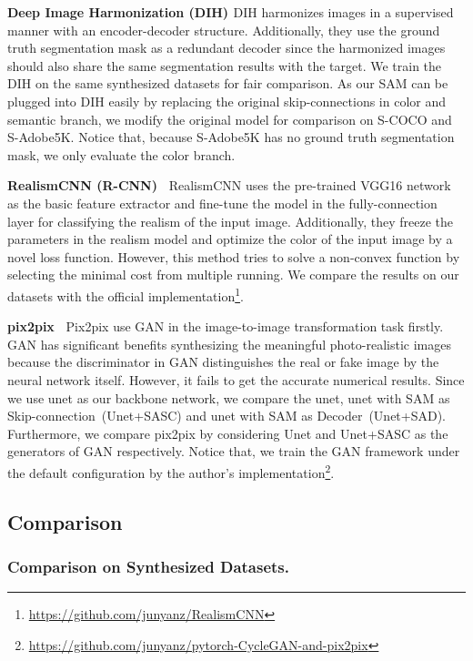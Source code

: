 \textbf{Deep Image Harmonization (DIH) \cite{Tsai:2017kv}} DIH harmonizes images in a supervised manner with an encoder-decoder structure. Additionally, they use the ground truth segmentation mask as a redundant decoder since the harmonized images should also share the same segmentation results with the target.
We train the DIH on the same synthesized datasets for fair comparison. As our SAM can be plugged into DIH easily by replacing the original skip-connections in color and semantic branch, we modify the original model for comparison on S-COCO and S-Adobe5K. Notice that, because S-Adobe5K has no ground truth segmentation mask, we only evaluate the color branch.

\textbf{RealismCNN (R-CNN)~\cite{Zhu:2015tl}} RealismCNN uses the pre-trained VGG16 network as the basic feature extractor and fine-tune the model in the fully-connection layer for classifying the realism of the input image. Additionally, they freeze the parameters in the realism model and optimize the color of the input image by a novel loss function. However, this method tries to solve a non-convex function by selecting the minimal cost from multiple running. We compare the results on our datasets with the official implementation\footnote{\hyperlink{https://github.com/junyanz/RealismCNN}{https://github.com/junyanz/RealismCNN}}.


\textbf{pix2pix~\cite{Isola:2016tp}} Pix2pix use GAN in the image-to-image transformation task firstly. GAN has significant benefits synthesizing the meaningful photo-realistic images because the discriminator in GAN distinguishes the real or fake image by the neural network itself. However, it fails to get the accurate numerical results. Since we use unet as our backbone network, we compare the unet, unet with SAM as Skip-connection~(Unet+SASC) and unet with SAM as Decoder~(Unet+SAD). Furthermore, we compare pix2pix by considering Unet and Unet+SASC as the generators of GAN respectively. Notice that, we train the GAN framework under the default configuration by the author's  implementation\footnote{\hyperlink{https://github.com/junyanz/pytorch-CycleGAN-and-pix2pix}{https://github.com/junyanz/pytorch-CycleGAN-and-pix2pix}}. 



\subsection{Comparison}
\label{sec:com}

\subsubsection{Comparison on Synthesized Datasets.}


